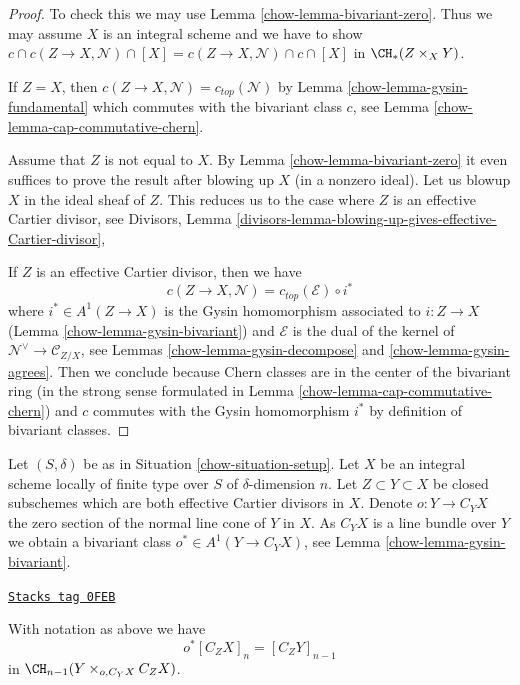 \begin{proof}

To check this we may use Lemma \ref{chow-lemma-bivariant-zero}.
Thus we may assume $X$ is an integral scheme and we have to show
$c \cap c(Z \to X, \mathcal{N}) \cap [X] =
c(Z \to X, \mathcal{N}) \cap c \cap [X]$ in $\CH_*(Z \times_X Y)$.

\medskip\noindent
If $Z = X$, then $c(Z \to X, \mathcal{N}) = c_{top}(\mathcal{N})$ by
Lemma \ref{chow-lemma-gysin-fundamental} which commutes
with the bivariant class $c$, see Lemma \ref{chow-lemma-cap-commutative-chern}.

\medskip\noindent
Assume that $Z$ is not equal to $X$. By Lemma \ref{chow-lemma-bivariant-zero}
it even suffices to prove the result after blowing up $X$ (in a nonzero ideal).
Let us blowup $X$ in the ideal sheaf of $Z$. This reduces us to the case
where $Z$ is an effective Cartier divisor, see
Divisors, Lemma
\ref{divisors-lemma-blowing-up-gives-effective-Cartier-divisor},

\medskip\noindent
If $Z$ is an effective Cartier divisor, then we have
$$
c(Z \to X, \mathcal{N}) =
c_{top}(\mathcal{E}) \circ i^*
$$
where $i^* \in A^1(Z \to X)$ is the Gysin homomorphism
associated to $i : Z \to X$ (Lemma \ref{chow-lemma-gysin-bivariant})
and $\mathcal{E}$ is the dual of the kernel of
$\mathcal{N}^\vee \to \mathcal{C}_{Z/X}$, see
Lemmas \ref{chow-lemma-gysin-decompose} and \ref{chow-lemma-gysin-agrees}.
Then we conclude because Chern classes are in the center of the
bivariant ring (in the strong sense formulated in
Lemma \ref{chow-lemma-cap-commutative-chern}) and $c$ commutes
with the Gysin homomorphism $i^*$ by definition of bivariant classes.
\end{proof}

Let $(S, \delta)$ be as in Situation \ref{chow-situation-setup}. Let $X$ be an
integral scheme locally of finite type over $S$ of $\delta$-dimension $n$.
Let $Z \subset Y \subset X$ be closed subschemes which are both effective
Cartier divisors in $X$. Denote $o : Y \to C_Y X$ the zero section of the
normal line cone of $Y$ in $X$. As $C_YX$ is a line bundle over $Y$
we obtain a bivariant class $o^* \in A^1(Y \to C_YX)$, see
Lemma \ref{chow-lemma-gysin-bivariant}.

\begin{lemma}
\label{chow-lemma-relation-normal-cones}
\href{https://stacks.math.columbia.edu/tag/0FEB}{\texttt{Stacks tag 0FEB}}

With notation as above we have
$$
o^*[C_ZX]_n = [C_Z Y]_{n - 1}
$$
in $\CH_{n - 1}(Y \times_{o, C_Y X} C_ZX)$.
\end{lemma}

